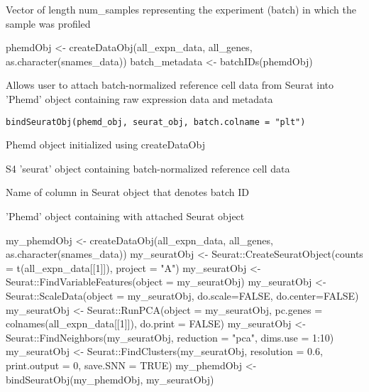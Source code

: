 \documentclass[a4paper]{book}
\begin{document}
%
\begin{Value}
Vector of length num\_samples representing the experiment (batch) in which the sample was profiled
\end{Value}
%
\begin{Examples}
\begin{ExampleCode}
phemdObj <- createDataObj(all_expn_data, all_genes, as.character(snames_data))
batch_metadata <- batchIDs(phemdObj)

\end{ExampleCode}
\end{Examples}
%
\begin{Description}\relax
Allows user to attach batch-normalized reference cell data from Seurat into 'Phemd' object containing raw expression data and metadata
\end{Description}
%
\begin{Usage}
\begin{verbatim}
bindSeuratObj(phemd_obj, seurat_obj, batch.colname = "plt")
\end{verbatim}
\end{Usage}
%
\begin{Arguments}
\begin{ldescription}
\item[\code{phemd\_obj}] Phemd object initialized using createDataObj

\item[\code{seurat\_obj}] S4 'seurat' object containing batch-normalized reference cell data

\item[\code{batch.colname}] Name of column in Seurat object that denotes batch ID
\end{ldescription}
\end{Arguments}
%
\begin{Value}
'Phemd' object containing with attached Seurat object
\end{Value}
%
\begin{Examples}
\begin{ExampleCode}

my_phemdObj <- createDataObj(all_expn_data, all_genes, as.character(snames_data))
my_seuratObj <- Seurat::CreateSeuratObject(counts = t(all_expn_data[[1]]), project = "A")
my_seuratObj <- Seurat::FindVariableFeatures(object = my_seuratObj)
my_seuratObj <- Seurat::ScaleData(object = my_seuratObj, do.scale=FALSE, do.center=FALSE)
my_seuratObj <- Seurat::RunPCA(object = my_seuratObj, pc.genes = colnames(all_expn_data[[1]]), do.print = FALSE)
my_seuratObj <- Seurat::FindNeighbors(my_seuratObj, reduction = "pca", dims.use = 1:10)
my_seuratObj <- Seurat::FindClusters(my_seuratObj, resolution = 0.6, print.output = 0, save.SNN = TRUE)
my_phemdObj <- bindSeuratObj(my_phemdObj, my_seuratObj)

\end{ExampleCode}
\end{Examples}
\end{document}
